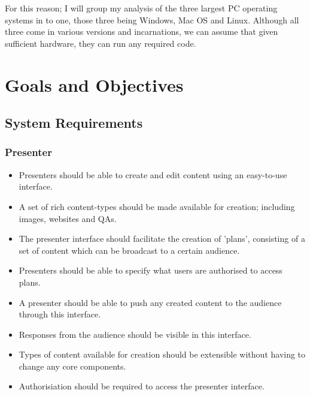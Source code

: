 \documentclass[a4papert,11pt,notitlepage]{ltxdoc}
\begin{document}
For this reason; I will group my analysis of the three largest PC operating systems in to one, those three being Windows, Mac OS and Linux. Although all three come in various versions and incarnations, we can assume that given sufficient hardware, they can run any required code.


\section{Goals and Objectives}
\subsection{System Requirements}
\subsubsection{Presenter}
\begin{itemize}
\item Presenters should be able to create and edit content using an easy-to-use interface.
\item A set of rich content-types should be made available for creation; including images, websites and QAs.
\item The presenter interface should facilitate the creation of 'plans', consisting of a set of content which can be broadcast to a certain audience.
\item Presenters should be able to specify what users are authorised to access plans.
\item A presenter should be able to push any created content to the audience through this interface.
\item Responses from the audience should be visible in this interface.
\item Types of content available for creation should be extensible without having to change any core components.
\item Authorisiation should be required to access the presenter interface.
\end{itemize}
\end{document}
